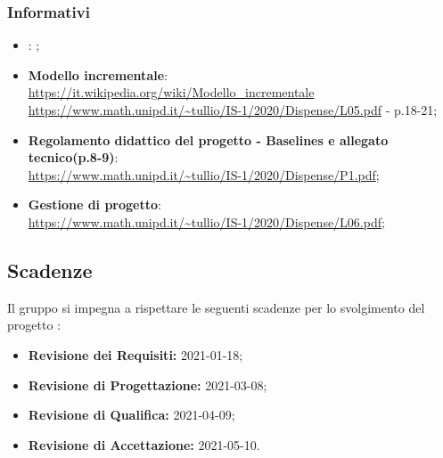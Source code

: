 \subsubsection{Informativi}
\begin{itemize}
\item \textbf{\AdR}: ;
\item \textbf{Modello incrementale}:\\ \url{https://it.wikipedia.org/wiki/Modello_incrementale} \\ \url{https://www.math.unipd.it/~tullio/IS-1/2020/Dispense/L05.pdf} - p.18-21;
\item \textbf{Regolamento didattico del progetto - Baselines e allegato tecnico(p.8-9)}:\\ \url{https://www.math.unipd.it/~tullio/IS-1/2020/Dispense/P1.pdf};
\item \textbf{Gestione di progetto}:\\ \url{https://www.math.unipd.it/~tullio/IS-1/2020/Dispense/L06.pdf};

\end{itemize}

\subsection{Scadenze}
Il gruppo \Omicron{} si impegna a rispettare le seguenti scadenze per lo svolgimento del progetto \nameproject{}:
\begin{itemize}
\item \textbf{Revisione dei Requisiti:} 2021-01-18;
\item \textbf{Revisione di Progettazione:} 2021-03-08;
\item \textbf{Revisione di Qualifica:} 2021-04-09;
\item \textbf{Revisione di Accettazione:} 2021-05-10.
\end{itemize}